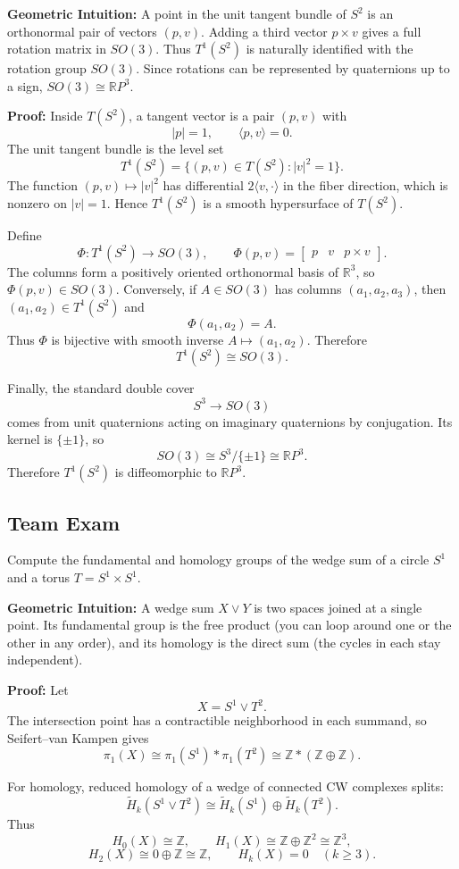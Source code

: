 \begin{solution}
\textbf{Geometric Intuition:} A point in the unit tangent bundle of $S^2$ is an orthonormal pair of vectors $(p, v)$. Adding a third vector $p \times v$ gives a full rotation matrix in $SO(3)$. Thus $T^1(S^2)$ is naturally identified with the rotation group $SO(3)$. Since rotations can be represented by quaternions up to a sign, $SO(3) \cong \mathbb{R}P^3$.

\textbf{Proof:}
Inside $T(S^2)$, a tangent vector is a pair $(p,v)$ with
\[
|p|=1,\qquad \langle p,v\rangle=0.
\]
The unit tangent bundle is the level set
\[
T^1(S^2)=\{(p,v)\in T(S^2): |v|^2=1\}.
\]
The function $(p,v)\mapsto |v|^2$ has differential $2\langle v,\cdot\rangle$ in the fiber direction, which is nonzero on $|v|=1$. Hence $T^1(S^2)$ is a smooth hypersurface of $T(S^2)$.

Define
\[
\Phi:T^1(S^2)\to SO(3),\qquad
\Phi(p,v)=\begin{bmatrix}p&v&p\times v\end{bmatrix}.
\]
The columns form a positively oriented orthonormal basis of $\mathbb{R}^3$, so $\Phi(p,v)\in SO(3)$. Conversely, if $A\in SO(3)$ has columns $(a_1,a_2,a_3)$, then $(a_1,a_2)\in T^1(S^2)$ and
\[
\Phi(a_1,a_2)=A.
\]
Thus $\Phi$ is bijective with smooth inverse $A\mapsto (a_1,a_2)$. Therefore
\[
T^1(S^2)\cong SO(3).
\]

Finally, the standard double cover
\[
S^3\to SO(3)
\]
comes from unit quaternions acting on imaginary quaternions by conjugation. Its kernel is $\{\pm 1\}$, so
\[
SO(3)\cong S^3/\{\pm 1\}\cong \mathbb{R}P^3.
\]
Therefore $T^1(S^2)$ is diffeomorphic to $\mathbb{R}P^3$.
\end{solution}

\subsection{Team Exam}

\begin{exercise}
\label{geometry:2014:7}
Compute the fundamental and homology groups of the wedge sum of a circle $S^{1}$ and a torus $T = S^{1} \times S^{1}$.
\end{exercise}

\begin{solution}
\textbf{Geometric Intuition:} A wedge sum $X \vee Y$ is two spaces joined at a single point. Its fundamental group is the free product (you can loop around one or the other in any order), and its homology is the direct sum (the cycles in each stay independent).

\textbf{Proof:} Let
\[
X=S^1\vee T^2.
\]
The intersection point has a contractible neighborhood in each summand, so Seifert--van Kampen gives
\[
\pi_1(X)\cong \pi_1(S^1)*\pi_1(T^2)
\cong \mathbb{Z}*(\mathbb{Z}\oplus \mathbb{Z}).
\]

For homology, reduced homology of a wedge of connected CW complexes splits:
\[
\widetilde H_k(S^1\vee T^2)
\cong
\widetilde H_k(S^1)\oplus \widetilde H_k(T^2).
\]
Thus
\[
H_0(X)\cong \mathbb{Z},\qquad
H_1(X)\cong \mathbb{Z}\oplus \mathbb{Z}^2\cong \mathbb{Z}^3,
\]
\[
H_2(X)\cong 0\oplus \mathbb{Z}\cong \mathbb{Z},
\qquad
H_k(X)=0\quad (k\geq 3).
\]
\end{solution}

